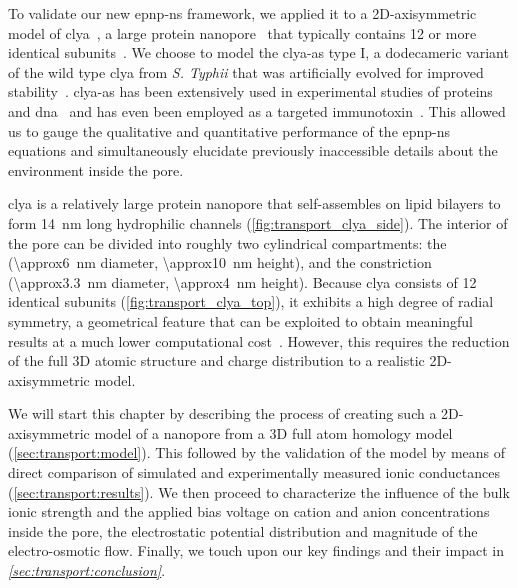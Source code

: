 To validate our new \gls{epnp-ns} framework, we applied it to a 2D-axisymmetric model of
\gls{clya}~\cite{Mueller-2009}, a large protein nanopore~\cite{Soskine-2012} that typically contains 12 or
more identical subunits~\cite{Soskine-2013,Peng-2019}. We choose to model the \gls{clya-as} type I, a
dodecameric variant of the wild type \gls{clya} from \textit{S. Typhii} that was artificially evolved for
improved stability~\cite{Soskine-2013}. \Gls{clya-as} has been extensively used in experimental studies of
proteins~\cite{Soskine-2013,VanMeervelt-2014,Soskine-Biesemans-2015,Biesemans-2015,Wloka-2017,
VanMeervelt-2017,Galenkamp-2018,Willems-Ruic-Biesemans-2019,Zernia-2020,Galenkamp-2020} and
\gls{dna}~\cite{Franceschini-2013,Franceschini-2016,Nomidis-2018} and has even been employed as a targeted
immunotoxin~\cite{Mutter-2018}. This allowed us to gauge the qualitative and quantitative performance of the
\gls{epnp-ns} equations and simultaneously elucidate previously inaccessible details about the environment
inside the pore.

\Gls{clya} is a relatively large protein nanopore that self-assembles on lipid bilayers to form \SI{14}{\nm}
long hydrophilic channels (\cref{fig:transport_clya_side}). The interior of the pore can be divided into
roughly two cylindrical compartments: the \cisi{} \lumen{} (\SI{\approx6}{\nm} diameter, \SI{\approx10}{\nm}
height), and the \transi{} constriction (\SI{\approx3.3}{\nm} diameter, \SI{\approx4}{\nm} height). Because
\gls{clya} consists of 12 identical subunits (\cref{fig:transport_clya_top}), it exhibits a high degree of
radial symmetry, a geometrical feature that can be exploited to obtain meaningful results at a much lower
computational cost~\cite{Cervera-2005,Lu-2012,Pederson-2015}. However, this requires the reduction of the full
3D atomic structure and charge distribution to a realistic 2D-axisymmetric model.

We will start this chapter by describing the process of creating such a 2D-axisymmetric model of a nanopore
from a 3D full atom homology model (\cref{sec:transport:model}). This followed by the validation of the model
by means of direct comparison of simulated and experimentally measured ionic conductances
(\cref{sec:transport:results}). We then proceed to characterize the influence of the bulk ionic strength and
the applied bias voltage on cation and anion concentrations inside the pore, the electrostatic potential
distribution and magnitude of the electro-osmotic flow. Finally, we touch upon our key findings and their
impact in \emph{\cref{sec:transport:conclusion}}.



